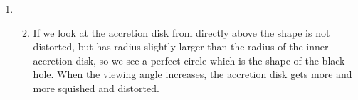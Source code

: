 \documentclass[12pt,a4]{article}
\begin{document}
\begin{enumerate}
\begin{enumerate}
\begin{align*}
                \right)
        \end{align*}
        And the observer's coordinates are:
        \begin{equation*}
          \left(
          \begin{matrix}
             a \sin \theta \cos \phi \\
             a \sin \theta \sin \phi \\
             a \cos \theta 
          \end{matrix}
          \right)
        \end{equation*}
        Equating the $z$ components gives:
        \begin{align*}
          \cos \theta = \sin \phi_0 \sin \phi' = \sin \phi_0 \frac{\sin \theta \sin \phi}{\cos \phi_0} & \Rightarrow \left(\tan \theta\right)^{-1} =  \tan \phi_0 \sin \phi\\
                                                                                                       & \Rightarrow \theta = \arctan\left(\frac{1}{\tan \phi_0 \sin \phi }\right)
        \end{align*}
        Equating the $x$ components gives:
        \begin{align*}
          \cos \phi' = \sin \theta \cos \phi = \frac{\cos \phi_0 \sin \phi'}{\sin \phi} \cos \phi & \Rightarrow \tan \phi ' =  \tan \phi \sec \theta_0\\
                                                                                                       & \Rightarrow \phi' = \arctan\left(\tan \phi \sec \theta_0\right)
        \end{align*}
    \end{enumerate}
  \item
    \begin{enumerate}
        \setcounter{enumii}{1}
      \item
        If we look at the accretion disk from directly above the shape is not distorted, but has radius slightly larger than the radius of the inner accretion disk, so we see a perfect circle which is the shape of the black hole.
        When the viewing angle increases, the accretion disk gets more and more squished and distorted.
    \end{enumerate}
\end{enumerate}
%
\end{document}

